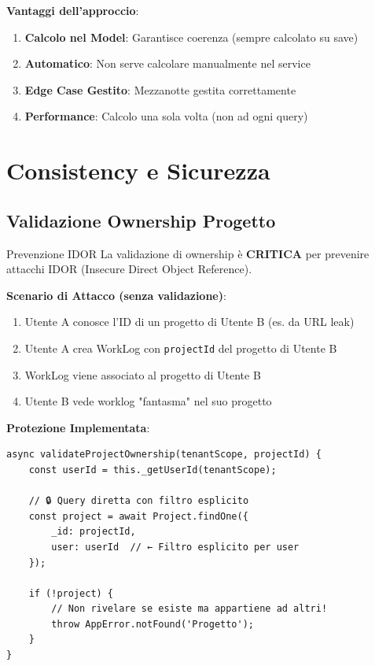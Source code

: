 \documentclass[11pt,a4paper]{article}
\begin{document}
\textbf{Vantaggi dell'approccio}:
\begin{enumerate}
    \item \textbf{Calcolo nel Model}: Garantisce coerenza (sempre calcolato su save)
    \item \textbf{Automatico}: Non serve calcolare manualmente nel service
    \item \textbf{Edge Case Gestito}: Mezzanotte gestita correttamente
    \item \textbf{Performance}: Calcolo una sola volta (non ad ogni query)
\end{enumerate}

\section{Consistency e Sicurezza}

\subsection{Validazione Ownership Progetto}

\begin{importantbox}{Prevenzione IDOR}
La validazione di ownership è \textbf{CRITICA} per prevenire attacchi IDOR (Insecure Direct Object Reference).
\end{importantbox}

\textbf{Scenario di Attacco (senza validazione)}:
\begin{enumerate}
    \item Utente A conosce l'ID di un progetto di Utente B (es. da URL leak)
    \item Utente A crea WorkLog con \texttt{projectId} del progetto di Utente B
    \item WorkLog viene associato al progetto di Utente B
    \item Utente B vede worklog "fantasma" nel suo progetto
\end{enumerate}

\textbf{Protezione Implementata}:
\begin{lstlisting}
async validateProjectOwnership(tenantScope, projectId) {
    const userId = this._getUserId(tenantScope);
    
    // 🔒 Query diretta con filtro esplicito
    const project = await Project.findOne({ 
        _id: projectId, 
        user: userId  // ← Filtro esplicito per user
    });
    
    if (!project) {
        // Non rivelare se esiste ma appartiene ad altri!
        throw AppError.notFound('Progetto');
    }
}
\end{lstlisting}
\end{document}
